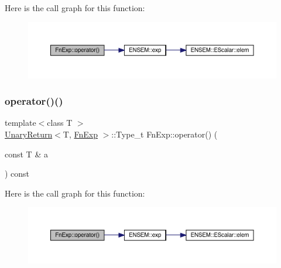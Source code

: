 Here is the call graph for this function\+:
\nopagebreak
\begin{figure}[H]
\begin{center}
\leavevmode
\includegraphics[width=350pt]{d3/d99/structFnExp_a42b9ce4950a3772fe907b8da3497267e_cgraph}
\end{center}
\end{figure}
\mbox{\label{structFnExp_a42b9ce4950a3772fe907b8da3497267e}} 
\subsubsection{\texorpdfstring{operator()()}{operator()()}\hspace{0.1cm}{\footnotesize\ttfamily [2/3]}}
{\footnotesize\ttfamily template$<$class T $>$ \\
\mbox{\hyperlink{structUnaryReturn}{Unary\+Return}}$<$T, \mbox{\hyperlink{structFnExp}{Fn\+Exp}} $>$\+::Type\+\_\+t Fn\+Exp\+::operator() (\begin{DoxyParamCaption}\item[{const T \&}]{a }\end{DoxyParamCaption}) const\hspace{0.3cm}{\ttfamily [inline]}}

Here is the call graph for this function\+:
\nopagebreak
\begin{figure}[H]
\begin{center}
\leavevmode
\includegraphics[width=350pt]{d3/d99/structFnExp_a42b9ce4950a3772fe907b8da3497267e_cgraph}
\end{center}
\end{figure}
\mbox{\label{structFnExp_a42b9ce4950a3772fe907b8da3497267e}} 
